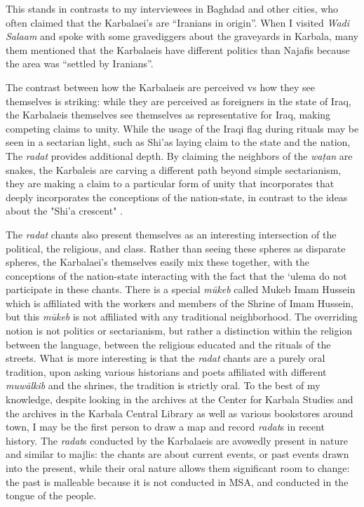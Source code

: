 This stands in contrasts to my interviewees in Baghdad and other cities, who often claimed that the Karbalaei’s are “Iranians in origin”. When I visited \emph{Wadi Salaam} and spoke with some gravediggers about the graveyards in Karbala, many them mentioned that the Karbalaeis have different politics than Najafis because the area was “settled by Iranians”. 

The contrast between how the Karbalaeis are perceived vs how they see themselves is striking: while they are perceived as foreigners in the state of Iraq, the Karbalaeis themselves see themselves as representative for Iraq, making competing claims to unity. While the usage of the Iraqi flag during rituals may be seen in a sectarian light, such as Shi'as laying claim to the state and the nation, The \emph{radat} provides additional depth. By claiming the neighbors of the \emph{waṭan} are snakes, the Karbaleis are carving a different path beyond simple sectarianism, they are making a claim to a particular form of unity that incorporates that deeply incorporates the conceptions of the nation-state, in contrast to the ideas about the "Shi'a crescent" \cite[120]{haddad_understanding_2020}. 

The \emph{radat} chants also present themselves as an interesting intersection of the political, the religious, and class. Rather than seeing these spheres as disparate spheres, the Karbalaei’s themselves easily mix these together, with the conceptions of the nation-state interacting with the fact that the ‘ulema do not participate in these chants. There is a special \emph{mūkeb} called Mukeb Imam Hussein which is affiliated with the workers and members of the Shrine of Imam Hussein, but this \emph{mūkeb} is not affiliated with any traditional neighborhood. The overriding notion is not politics or sectarianism, but rather a distinction within the religion between the language, between the religious educated and the rituals of the streets. What is more interesting is that the \emph{radat} chants are a purely oral tradition, upon asking various historians and poets affiliated with different \emph{muwālkib} and the shrines, the tradition is strictly oral. To the best of my knowledge, despite looking in the archives at the Center for Karbala Studies and the archives in the Karbala Central Library as well as various bookstores around town, I may be the first person to draw a map and record \emph{radat}s in recent history. The \emph{radat}s conducted by the Karbalaeis are avowedly present in nature and similar to majlis: the chants are about current events, or past events drawn into the present, while their oral nature allows them significant room to change: the past is malleable because it is not conducted in MSA, and conducted in the tongue of the people. 

